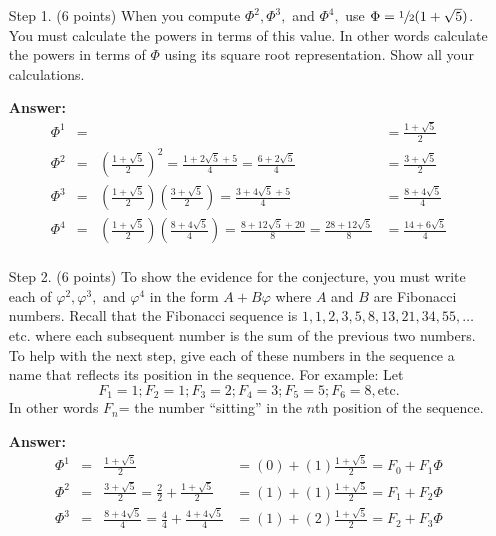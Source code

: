 \documentclass[letterpaper, 12pt]{article}
\begin{document}
\begin{enumerate}

\item[Step 1.] (6 points) When you compute $\Phi^2, \Phi^3,$ and $\Phi^4,$ use $\Phi = \sfrac{1}{2}(1 + \sqrt{5})$. You must calculate the powers in terms of this value. In other words calculate the powers in terms of $\Phi$ using its square root representation. Show all your calculations.

\textbf{Answer:}
\[\begin{array}{rcll}
\Phi^1 &=&&= \frac{1 + \sqrt{5}}{2}\\

\Phi^2 &=& \left(\frac{1 + \sqrt{5}}{2}\right)^2 = \frac{1+2\sqrt{5}+5}{4} = \frac{6+2\sqrt{5}}{4}&= \frac{3+\sqrt{5}}{2}\\

\Phi^3 &=& \left(\frac{1 + \sqrt{5}}{2}\right)\left(\frac{3+\sqrt{5}}{2}\right) = \frac{3+4\sqrt{5}+5}{4}& = \frac{8+4\sqrt{5}}{4} \\

\Phi^4 &=& \left(\frac{1 + \sqrt{5}}{2}\right)\left(\frac{8+4\sqrt{5}}{4}\right) = \frac{8+12\sqrt{5}+20}{8} = \frac{28+12\sqrt{5}}{8} &= \frac{14+6\sqrt{5}}{4} \\

\end{array}\]

\item [Step 2.] (6 points) To show the evidence for the conjecture, you must write each of $φ^2, φ^3,$ and $φ^4$ in the form $A + Bφ$ where $A$ and $B$ are Fibonacci numbers. Recall that the Fibonacci sequence is $1, 1,2, 3, 5, 8, 13, 21, 34, 55, \ldots$ etc. where each subsequent number is the sum of the previous two numbers. To help with the next step, give each of these numbers in the sequence a name that reflects its position in the sequence. For example: Let
$$F_1= 1; F_2 = 1; F_3 = 2; F_4 = 3; F_5= 5; F_6 = 8, \text{etc.}$$
In other words $F_n$= the number “sitting” in the $n$th position of the sequence.

\textbf{Answer:}
\[\begin{array}{rcll}
\Phi^1 &=& \frac{1 + \sqrt{5}}{2} & = (0)+ (1)\frac{1 + \sqrt{5}}{2} = F_0 + F_1\Phi\\

\Phi^2 &=& \frac{3+\sqrt{5}}{2} = \frac{2}{2} + \frac{1+\sqrt{5}}{2}&= (1)+ (1)\frac{1+\sqrt{5}}{2} = F_1 + F_2\Phi\\

\Phi^3 &=& \frac{8+4\sqrt{5}}{4} = \frac{4}{4} + \frac{4+4\sqrt{5}}{4} & = (1) + (2)\frac{1+\sqrt{5}}{2} = F_2 + F_3\Phi\\


\end{array}\]
\end{enumerate}
\end{document}
